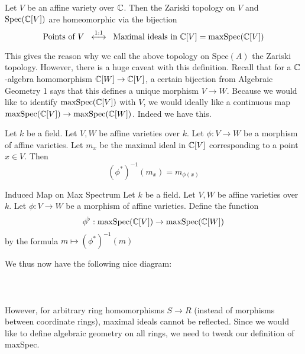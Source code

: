 \documentclass[a4paper]{article}
\begin{document}
\begin{prp}{}{} Let $V$ be an affine variety over $\mathbb{C}$. Then the Zariski topology on $V$ and $\text{Spec}(\mathbb{C}[V])$ are homeomorphic via the bijection $$\text{Points of }V\;\;\overset{1:1}{\longleftrightarrow}\;\;\text{Maximal ideals in }\mathbb{C}[V]=\text{maxSpec}(\mathbb{C}[V])$$
\end{prp}

This gives the reason why we call the above topology on $\text{Spec}(A)$ the Zariski topology. However, there is a huge caveat with this definition. Recall that for a $\mathbb{C}$-algebra homomorphism $\mathbb{C}[W]\to\mathbb{C}[V]$, a certain bijection from Algebraic Geometry 1 says that this defines a unique morphism $V\to W$. Because we would like to identify $\text{maxSpec}(\mathbb{C}[V])$ with $V$, we would ideally like a continuous map $\text{maxSpec}(\mathbb{C}[V])\to\text{maxSpec}(\mathbb{C}[W])$. Indeed we have this. 

\begin{lmm}{}{} Let $k$ be a field. Let $V,W$ be affine varieties over $k$. Let $\phi:V\to W$ be a morphism of affine varieties. Let $m_x$ be the maximal ideal in $\mathbb{C}[V]$ corresponding to a point $x\in V$. Then $$(\phi^\ast)^{-1}(m_x)=m_{\phi(x)}$$
\end{lmm}

\begin{defn}{Induced Map on Max Spectrum}{} Let $k$ be a field. Let $V,W$ be affine varieties over $k$. Let $\phi:V\to W$ be a morphism of affine varieties. Define the function $$\phi^\flat:\text{maxSpec}(\mathbb{C}[V])\to\text{maxSpec}(\mathbb{C}[W])$$ by the formula $m\mapsto(\phi^\ast)^{-1}(m)$
\end{defn}

We thus now have the following nice diagram: \\~\\
\\~\\

However, for arbitrary ring homomorphisms $S\to R$ (instead of morphisms between coordinate rings), maximal ideals cannot be reflected. Since we would like to define algebraic geometry on all rings, we need to tweak our definition of maxSpec. 
\end{document}
